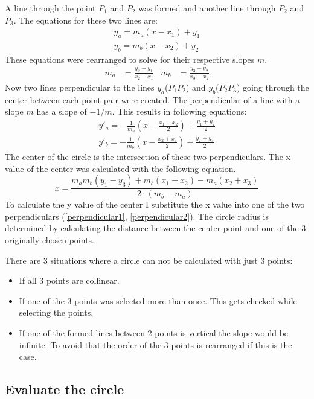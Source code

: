 A line through the point $P_1$ and $P_2$ was formed and another line through $P_2$ and $P_3$. The equations for these two lines are:
\begin{align*}
	y_a = m_a(x-x_1) + y_1\\
	y_b = m_b(x-x_2) + y_2
\end{align*}
These equations were rearranged to solve for their respective slopes $m$.
\begin{align}
	m_a& = \frac{y_2 - y_1}{x_2 - x_1}&
	m_b& = \frac{y_3 - y_2}{x_3 - x_2}
\end{align}
Now two lines perpendicular to the lines $y_a$($P_1P_2$) and $y_b$($P_2P_3$) going through the center between each point pair were created. The perpendicular of a line with a slope $m$ has a slope of $-1/m$. This results in following equations:
\begin{align}
	y'_a = -\frac{1}{m_a}(x-\frac{x_1 + x_2}{2}) + \frac{y_1 + y_2}{2}\label{perpendicular1}\\
	y'_b = -\frac{1}{m_b}(x-\frac{x_2 + x_3}{2}) + \frac{y_2 + y_3}{2}\label{perpendicular2}
\end{align}
The center of the circle is the intersection of these two perpendiculars. The x-value of the center was calculated with the following equation.
\begin{equation}
	x = \frac{m_am_b(y_1-y_3) + m_b(x_1+x_2) - m_a(x_2+x_3)}{2\cdot(m_b-m_a)}
\end{equation}
To calculate the y value of the center I substitute the x value into one of the two perpendiculars (\ref{perpendicular1}, \ref{perpendicular2}). The circle radius is determined by calculating the distance between the center point and one of the 3 originally chosen points.

There are 3 situations where a circle can not be calculated with just 3 points:
\begin{itemize}
	\item If all 3 points are collinear.
	\item If one of the 3 points was selected more than once. This gets checked while selecting the points.
	\item If one of the formed lines between 2 points is vertical the slope would be infinite. To avoid that the order of the 3 points is rearranged if this is the case. 
\end{itemize}

\subsection{Evaluate the circle}


